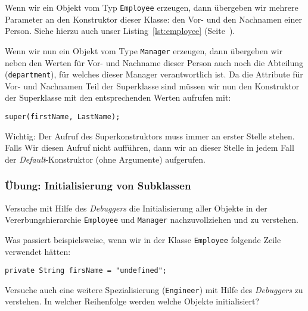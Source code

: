 Wenn wir ein Objekt vom Typ \texttt{Employee} erzeugen, dann übergeben wir mehrere Parameter
an den Konstruktor dieser Klasse: den Vor- und den Nachnamen einer Person. Siehe hierzu
auch unser Listing~\ref{lst:employee} (Seite~\pageref{lst:employee}).

Wenn wir nun ein Objekt vom Type \texttt{Manager} erzeugen, dann übergeben wir neben den
Werten für Vor- und Nachname dieser Person auch noch die Abteilung (\texttt{department}), für
welches dieser Manager verantwortlich ist. Da die Attribute für Vor- und Nachnamen Teil
der Superklasse sind müssen wir nun den Konstruktor der Superklasse mit den entsprechenden
Werten aufrufen mit:

\texttt{super(firstName, LastName);}

Wichtig: Der Aufruf des Superkonstruktors muss immer an erster Stelle stehen. Falls
Wir diesen Aufruf nicht aufführen, dann wir an dieser Stelle in jedem Fall der
\emph{Default}-Konstruktor (ohne Argumente) aufgerufen.

\begin{Exercise}[%
title={Initialisierung von Subklassen},
label={ex:init-subclasses}]

    \begin{frame}[fragile]
        \frametitle<presentation>{Übung: Initialisierung von Subklassen}
        Versuche mit Hilfe des \emph{Debuggers} die Initialisierung aller Objekte in der
        Vererbungshierarchie \texttt{Employee} und \texttt{Manager} nachzuvollziehen und
        zu verstehen.

        Was passiert beispielsweise, wenn wir in der Klasse \texttt{Employee} folgende
        Zeile verwendet hätten:

        \texttt{private String firsName = "undefined";}
    \end{frame}

    Versuche auch eine weitere Spezialisierung (\texttt{Engineer}) mit Hilfe des
    \emph{Debuggers} zu verstehen. In welcher Reihenfolge werden welche Objekte initialisiert?

\end{Exercise}



